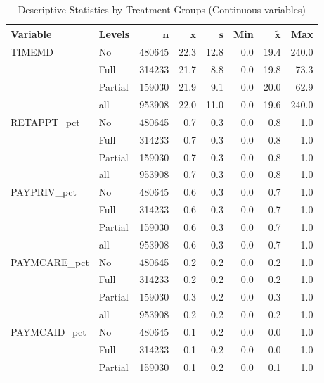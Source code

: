 \documentclass[11pt, oneside]{article}        %
\begin{document}
\begin{table}[ht]
\centering
\caption{Descriptive Statistics by Treatment Groups (Continuous variables)} 
{\footnotesize
\begin{tabular}{llrrrrrr}
 \textbf{Variable} & \textbf{Levels} & $\mathbf{n}$ & $\mathbf{\bar{x}}$ & $\mathbf{s}$ & \textbf{Min} & $\mathbf{\widetilde{x}}$ & \textbf{Max} \\ 
  \hline
TIMEMD & No & 480645 &   22.3 &   12.8 & 0.0 &   19.4 &  240.0 \\ 
   & Full & 314233 &   21.7 &    8.8 & 0.0 &   19.8 &   73.3 \\ 
   & Partial & 159030 &   21.9 &    9.1 & 0.0 &   20.0 &   62.9 \\ 
   \hline
 & all & 953908 &   22.0 &   11.0 & 0.0 &   19.6 &  240.0 \\ 
   \hline
RETAPPT\_pct & No & 480645 &    0.7 &    0.3 & 0.0 &    0.8 &    1.0 \\ 
   & Full & 314233 &    0.7 &    0.3 & 0.0 &    0.8 &    1.0 \\ 
   & Partial & 159030 &    0.7 &    0.3 & 0.0 &    0.8 &    1.0 \\ 
   \hline
 & all & 953908 &    0.7 &    0.3 & 0.0 &    0.8 &    1.0 \\ 
   \hline
PAYPRIV\_pct & No & 480645 &    0.6 &    0.3 & 0.0 &    0.7 &    1.0 \\ 
   & Full & 314233 &    0.6 &    0.3 & 0.0 &    0.7 &    1.0 \\ 
   & Partial & 159030 &    0.6 &    0.3 & 0.0 &    0.7 &    1.0 \\ 
   \hline
 & all & 953908 &    0.6 &    0.3 & 0.0 &    0.7 &    1.0 \\ 
   \hline
PAYMCARE\_pct & No & 480645 &    0.2 &    0.2 & 0.0 &    0.2 &    1.0 \\ 
   & Full & 314233 &    0.2 &    0.2 & 0.0 &    0.2 &    1.0 \\ 
   & Partial & 159030 &    0.3 &    0.2 & 0.0 &    0.3 &    1.0 \\ 
   \hline
 & all & 953908 &    0.2 &    0.2 & 0.0 &    0.2 &    1.0 \\ 
   \hline
PAYMCAID\_pct & No & 480645 &    0.1 &    0.2 & 0.0 &    0.0 &    1.0 \\ 
   & Full & 314233 &    0.1 &    0.2 & 0.0 &    0.0 &    1.0 \\ 
   & Partial & 159030 &    0.1 &    0.2 & 0.0 &    0.1 &    1.0 \\ 

\end{tabular}}
\end{table}
\end{document}
